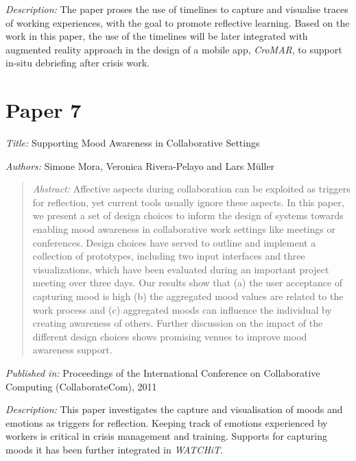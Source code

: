 \emph{Description: }The paper proses the use of timelines to capture and visualise traces of working experiences, with the goal to promote reflective learning. Based on the work in this paper, the use of the timelines will be later integrated with augmented reality approach in the design of a mobile app, \emph{CroMAR}, to support in-situ debriefing after crisis work.

\section*{Paper 7}

\emph{Title: }Supporting Mood Awareness in Collaborative Settings

\emph{Authors: }Simone Mora, Veronica Rivera-Pelayo and Lars Müller

\begin{quote}
	\emph{Abstract: }Affective aspects during collaboration can be exploited as triggers for reflection, yet current tools usually ignore these aspects. In this paper, we present a set of design choices to inform the design of systems towards enabling mood awareness in collaborative work settings like meetings or conferences. Design choices have served to outline and implement a collection of prototypes, including two input interfaces and three visualizations, which have been evaluated during an important project meeting over three days. Our results show that (a) the user acceptance of capturing mood is high (b) the aggregated mood values are related to the work process and (c) aggregated moods can influence the individual by creating awareness of others. Further discussion on the impact of the different design choices shows promising venues to improve mood awareness support.
	
\end{quote}

\emph{Published in: }Proceedings of the International Conference on Collaborative Computing (CollaborateCom), 2011

\emph{Description: }This paper investigates the capture and visualisation of moods and emotions as triggers for reflection. Keeping track of emotions experienced by workers is critical in crisis management and training. Supports for capturing moods it has been further integrated in \emph{WATCHiT}.

